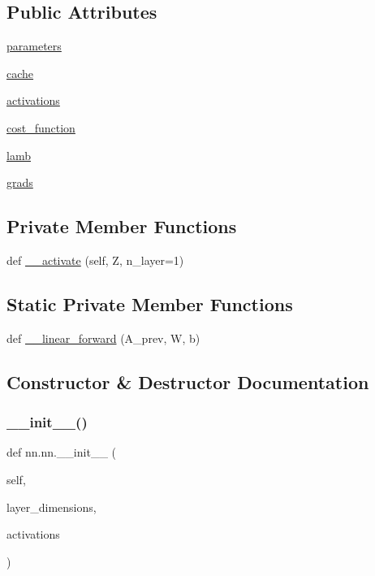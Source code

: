 \subsection*{Public Attributes}
\begin{DoxyCompactItemize}
\item 
\hyperlink{classnn_1_1nn_a69da89bd6d17dbc8596ab586b7678237}{parameters}
\item 
\hyperlink{classnn_1_1nn_a1f75a6242fc9ee82ca2632e18979b4d3}{cache}
\item 
\hyperlink{classnn_1_1nn_acb7fb4cc0db120b007ef1ab1f82d7ba0}{activations}
\item 
\hyperlink{classnn_1_1nn_adb4a96a154d03db3722022600e134c7f}{cost\+\_\+function}
\item 
\hyperlink{classnn_1_1nn_a11943885141afc3a47049b9d2769fd1b}{lamb}
\item 
\hyperlink{classnn_1_1nn_a50e9804c2895867c31833f877c7d5d60}{grads}
\end{DoxyCompactItemize}
\subsection*{Private Member Functions}
\begin{DoxyCompactItemize}
\item 
def \hyperlink{classnn_1_1nn_a1cefed6bf4fd61d437e68c901a15fda2}{\+\_\+\+\_\+activate} (self, Z, n\+\_\+layer=1)
\end{DoxyCompactItemize}
\subsection*{Static Private Member Functions}
\begin{DoxyCompactItemize}
\item 
def \hyperlink{classnn_1_1nn_a78173fb77f846a71e27f097b29e701f8}{\+\_\+\+\_\+linear\+\_\+forward} (A\+\_\+prev, W, b)
\end{DoxyCompactItemize}


\subsection{Constructor \& Destructor Documentation}
\mbox{\label{classnn_1_1nn_ad7304c7932970a07bf2869e97b79e0b5}} 
\subsubsection{\texorpdfstring{\+\_\+\+\_\+init\+\_\+\+\_\+()}{\_\_init\_\_()}}
{\footnotesize\ttfamily def nn.\+nn.\+\_\+\+\_\+init\+\_\+\+\_\+ (\begin{DoxyParamCaption}\item[{}]{self,  }\item[{}]{layer\+\_\+dimensions,  }\item[{}]{activations }\end{DoxyParamCaption})}

